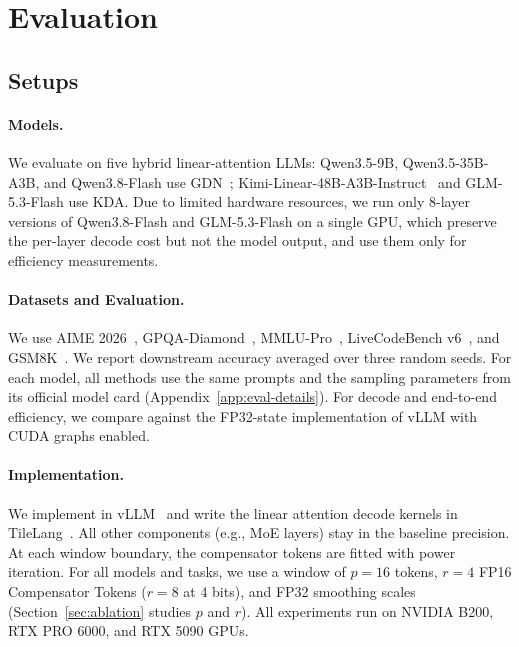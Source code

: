 \section{Evaluation}
\label{sec:evaluation}

\vspace{-0.5em}
\subsection{Setups}
\label{sec:eval-setup}

\paragraph{Models.}
We evaluate \method{} on five hybrid linear-attention LLMs: Qwen3.5-9B, Qwen3.5-35B-A3B, and Qwen3.8-Flash use GDN~\citep{yang2025gated}; Kimi-Linear-48B-A3B-Instruct~\citep{team2025kimi} and GLM-5.3-Flash use KDA.
Due to limited hardware resources, we run only 8-layer versions of Qwen3.8-Flash and GLM-5.3-Flash on a single GPU, which preserve the per-layer decode cost but not the model output, and use them only for efficiency measurements.

\paragraph{Datasets and Evaluation.}
We use AIME 2026~\citep{maa2026aime}, GPQA-Diamond~\citep{rein2023gpqa}, MMLU-Pro~\citep{wang2024mmlu}, LiveCodeBench v6~\citep{jain2025livecodebench}, and GSM8K~\citep{cobbe2021gsm8k}.
We report downstream accuracy averaged over three random seeds.
For each model, all methods use the same prompts and the sampling parameters from its official model card (Appendix~\ref{app:eval-details}).
For decode and end-to-end efficiency, we compare against the FP32-state implementation of vLLM with CUDA graphs enabled.

\paragraph{Implementation.}
We implement \method{} in vLLM~\citep{kwon2023efficient} and write the linear attention decode kernels in TileLang~\citep{wang2025tilelang}. 
All other components (e.g., MoE layers) stay in the baseline precision.
At each window boundary, the compensator tokens are fitted with power iteration.
For all models and tasks, we use a window of $p=16$ tokens, $r=4$ FP16 Compensator Tokens ($r=8$ at 4 bits), and FP32 smoothing scales (Section~\ref{sec:ablation} studies $p$ and $r$).
All experiments run on NVIDIA B200, RTX PRO 6000, and RTX 5090 GPUs.

